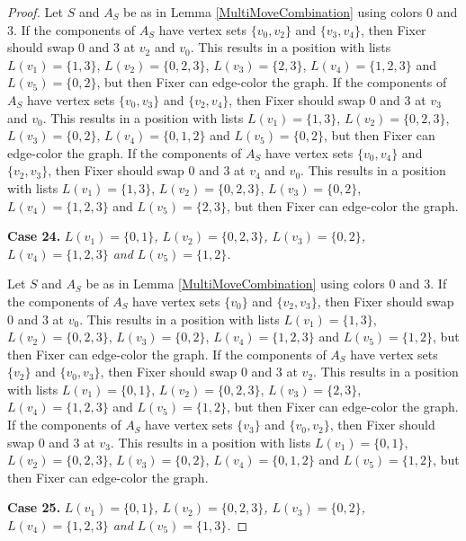 \documentclass[12pt]{amsart}
\theoremstyle{plain}
\theoremstyle{definition}
\theoremstyle{remark}
\begin{document}
\begin{proof}
Let $S$ and $A_S$ be as in Lemma \ref{MultiMoveCombination} using colors $0$ and $3$. If the components of $A_S$ have vertex sets $\{v_0, v_2\}$ and $\{v_3, v_4\}$, then Fixer should swap 0 and 3 at $v_2$ and $v_0$. This results in a position with lists $L(v_1) = \{1, 3\}$, $L(v_2) = \{0, 2, 3\}$, $L(v_3) = \{2, 3\}$, $L(v_4) = \{1, 2, 3\}$ and $L(v_5) = \{0, 2\}$, but then Fixer can edge-color the graph.
If the components of $A_S$ have vertex sets $\{v_0, v_3\}$ and $\{v_2, v_4\}$, then Fixer should swap 0 and 3 at $v_3$ and $v_0$. This results in a position with lists $L(v_1) = \{1, 3\}$, $L(v_2) = \{0, 2, 3\}$, $L(v_3) = \{0, 2\}$, $L(v_4) = \{0, 1, 2\}$ and $L(v_5) = \{0, 2\}$, but then Fixer can edge-color the graph.
If the components of $A_S$ have vertex sets $\{v_0, v_4\}$ and $\{v_2, v_3\}$, then Fixer should swap 0 and 3 at $v_4$ and $v_0$. This results in a position with lists $L(v_1) = \{1, 3\}$, $L(v_2) = \{0, 2, 3\}$, $L(v_3) = \{0, 2\}$, $L(v_4) = \{1, 2, 3\}$ and $L(v_5) = \{2, 3\}$, but then Fixer can edge-color the graph.

\noindent\textbf{Case 24.  }\textit{$L(v_1) = \{0, 1\}$, $L(v_2) = \{0, 2, 3\}$, $L(v_3) = \{0, 2\}$, $L(v_4) = \{1, 2, 3\}$ and $L(v_5) = \{1, 2\}$.}

Let $S$ and $A_S$ be as in Lemma \ref{MultiMoveCombination} using colors $0$ and $3$. If the components of $A_S$ have vertex sets $\{v_0\}$ and $\{v_2, v_3\}$, then Fixer should swap 0 and 3 at $v_0$. This results in a position with lists $L(v_1) = \{1, 3\}$, $L(v_2) = \{0, 2, 3\}$, $L(v_3) = \{0, 2\}$, $L(v_4) = \{1, 2, 3\}$ and $L(v_5) = \{1, 2\}$, but then Fixer can edge-color the graph.
If the components of $A_S$ have vertex sets $\{v_2\}$ and $\{v_0, v_3\}$, then Fixer should swap 0 and 3 at $v_2$. This results in a position with lists $L(v_1) = \{0, 1\}$, $L(v_2) = \{0, 2, 3\}$, $L(v_3) = \{2, 3\}$, $L(v_4) = \{1, 2, 3\}$ and $L(v_5) = \{1, 2\}$, but then Fixer can edge-color the graph.
If the components of $A_S$ have vertex sets $\{v_3\}$ and $\{v_0, v_2\}$, then Fixer should swap 0 and 3 at $v_3$. This results in a position with lists $L(v_1) = \{0, 1\}$, $L(v_2) = \{0, 2, 3\}$, $L(v_3) = \{0, 2\}$, $L(v_4) = \{0, 1, 2\}$ and $L(v_5) = \{1, 2\}$, but then Fixer can edge-color the graph.

\noindent\textbf{Case 25.  }\textit{$L(v_1) = \{0, 1\}$, $L(v_2) = \{0, 2, 3\}$, $L(v_3) = \{0, 2\}$, $L(v_4) = \{1, 2, 3\}$ and $L(v_5) = \{1, 3\}$.}


\end{proof}
\end{document}
